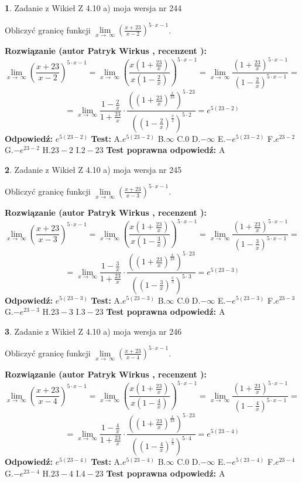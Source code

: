 \documentclass[12pt, a4paper]{article}
\theoremstyle{definition} %
\newtheorem{zad}{}
\newcommand{\zadStart}[1]{\begin{zad}#1\newline}
\newcommand{\zadStop}{\end{zad}}
\newcommand{\rozwStart}[2]{\noindent \textbf{Rozwiązanie (autor #1 , recenzent #2): }\newline}
\newcommand{\rozwStop}{\newline}
\newcommand{\odpStart}{\noindent \textbf{Odpowiedź:}\newline}
\newcommand{\odpStop}{\newline}
\newcommand{\testStart}{\noindent \textbf{Test:}\newline}
\newcommand{\testStop}{\newline}
\newcommand{\kluczStart}{\noindent \textbf{Test poprawna odpowiedź:}\newline}
\newcommand{\kluczStop}{\newline}
\begin{document}
\zadStart{Zadanie z Wikieł Z 4.10 a) moja wersja nr 244}


Obliczyć granicę funkcji  $\lim\limits_{x\to\ \infty}(\frac{x+23}{x-2})^{5\cdot x-1}$.
\zadStop
\rozwStart{Patryk Wirkus}{}
$$\lim\limits_{x\to\ \infty}(\frac{x+23}{x-2})^{5\cdot x-1} = \lim\limits_{x\to\ \infty}(\frac{x(1+\frac{23}{x})}{x(1-\frac{2}{x})})^{5\cdot x-1}=\lim\limits_{x\to\ \infty}\frac{(1+\frac{23}{x})^{5\cdot x-1}}{(1-\frac{2}{x})^{5\cdot x-1}}=$$
$$=\lim\limits_{x\to\ \infty}\frac{1-\frac{2}{x}}{1+\frac{23}{x}}\cdot\frac{((1+\frac{23}{x})^{\frac{x}{23}})^{5\cdot23}}{((1-\frac{2}{x})^{\frac{x}{2}})^{5\cdot2}}=e^{5(23-2)}$$
\rozwStop
\odpStart
$e^{5(23-2)}$
\odpStop
\testStart
A.$e^{5(23-2)}$ B.$\infty$ C.$0$ D.$-\infty$ E.$-e^{5(23-2)}$
F.$e^{23-2}$ G.$-e^{23-2}$
H.$23-2$
I.$2-23$
\testStop
\kluczStart
A
\kluczStop



\zadStart{Zadanie z Wikieł Z 4.10 a) moja wersja nr 245}


Obliczyć granicę funkcji  $\lim\limits_{x\to\ \infty}(\frac{x+23}{x-3})^{5\cdot x-1}$.
\zadStop
\rozwStart{Patryk Wirkus}{}
$$\lim\limits_{x\to\ \infty}(\frac{x+23}{x-3})^{5\cdot x-1} = \lim\limits_{x\to\ \infty}(\frac{x(1+\frac{23}{x})}{x(1-\frac{3}{x})})^{5\cdot x-1}=\lim\limits_{x\to\ \infty}\frac{(1+\frac{23}{x})^{5\cdot x-1}}{(1-\frac{3}{x})^{5\cdot x-1}}=$$
$$=\lim\limits_{x\to\ \infty}\frac{1-\frac{3}{x}}{1+\frac{23}{x}}\cdot\frac{((1+\frac{23}{x})^{\frac{x}{23}})^{5\cdot23}}{((1-\frac{3}{x})^{\frac{x}{3}})^{5\cdot3}}=e^{5(23-3)}$$
\rozwStop
\odpStart
$e^{5(23-3)}$
\odpStop
\testStart
A.$e^{5(23-3)}$ B.$\infty$ C.$0$ D.$-\infty$ E.$-e^{5(23-3)}$
F.$e^{23-3}$ G.$-e^{23-3}$
H.$23-3$
I.$3-23$
\testStop
\kluczStart
A
\kluczStop



\zadStart{Zadanie z Wikieł Z 4.10 a) moja wersja nr 246}


Obliczyć granicę funkcji  $\lim\limits_{x\to\ \infty}(\frac{x+23}{x-4})^{5\cdot x-1}$.
\zadStop
\rozwStart{Patryk Wirkus}{}
$$\lim\limits_{x\to\ \infty}(\frac{x+23}{x-4})^{5\cdot x-1} = \lim\limits_{x\to\ \infty}(\frac{x(1+\frac{23}{x})}{x(1-\frac{4}{x})})^{5\cdot x-1}=\lim\limits_{x\to\ \infty}\frac{(1+\frac{23}{x})^{5\cdot x-1}}{(1-\frac{4}{x})^{5\cdot x-1}}=$$
$$=\lim\limits_{x\to\ \infty}\frac{1-\frac{4}{x}}{1+\frac{23}{x}}\cdot\frac{((1+\frac{23}{x})^{\frac{x}{23}})^{5\cdot23}}{((1-\frac{4}{x})^{\frac{x}{4}})^{5\cdot4}}=e^{5(23-4)}$$
\rozwStop
\odpStart
$e^{5(23-4)}$
\odpStop
\testStart
A.$e^{5(23-4)}$ B.$\infty$ C.$0$ D.$-\infty$ E.$-e^{5(23-4)}$
F.$e^{23-4}$ G.$-e^{23-4}$
H.$23-4$
I.$4-23$
\testStop
\kluczStart
A
\kluczStop
\end{document}
